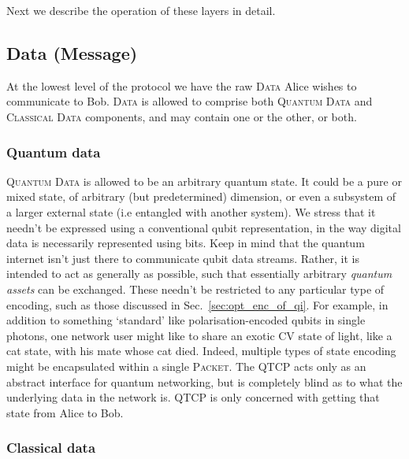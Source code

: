\documentclass[aps,rmp,twocolumn,amsmath,amssymb,nofootinbib,superscriptaddress,longbibliography,floatfix,table-of-contents,eqsecnum]{revtex4-1}
\begin{document}
Next we describe the operation of these layers in detail.

%
%

\subsection{Data (Message)} 

At the lowest level of the protocol we have the raw \textsc{Data} Alice wishes to communicate to Bob. \textsc{Data} is allowed to comprise both \textsc{Quantum Data} and \textsc{Classical Data} components, and may contain one or the other, or both.

%
%

\subsubsection{Quantum data} 

\textsc{Quantum Data} is allowed to be an arbitrary quantum state. It could be a pure or mixed state, of arbitrary (but predetermined) dimension, or even a subsystem of a larger external state (i.e entangled with another system). We stress that it needn't be expressed using a conventional qubit representation, in the way digital data is necessarily represented using bits. Keep in mind that the quantum internet isn't just there to communicate qubit data streams. Rather, it is intended to act as generally as possible, such that essentially arbitrary \textit{quantum assets} can be exchanged. These needn't be restricted to any particular type of encoding, such as those discussed in Sec.~\ref{sec:opt_enc_of_qi}. For example, in addition to something `standard' like polarisation-encoded qubits in single photons, one network user might like to share an exotic CV state of light, like a cat state, with his mate whose cat died. Indeed, multiple types of state encoding might be encapsulated within a single \textsc{Packet}. The QTCP acts only as an abstract interface for quantum networking, but is completely blind as to what the underlying data in the network is. QTCP is only concerned with getting that state from Alice to Bob.

%
%

\subsubsection{Classical data} 
\end{document}
